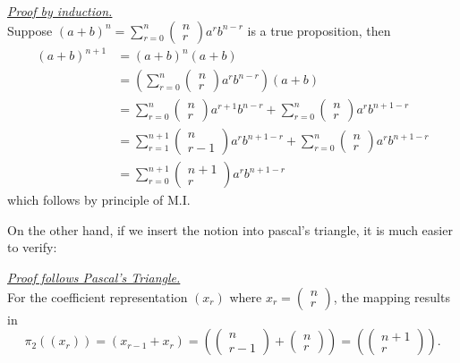 \documentclass[12pt]{article}
\renewenvironment{proof}[1][Proof]{\begin{snugshade*} \underline{\textit{{#1}.}}\\}{\hfill \qedsymbol \end{snugshade*}}
\begin{document}
    \begin{proof}[Proof by induction]
        Suppose $(a+b)^n=\sum_{r=0}^{n}\begin{pmatrix}
            n\\r
        \end{pmatrix}a^r b^{n-r}$ is a true proposition, then \begin{align*}
            (a+b)^{n+1}&=(a+b)^n(a+b)\\
            &=(\sum_{r=0}^{n}\begin{pmatrix}
                n\\r
            \end{pmatrix}a^r b^{n-r})(a+b)\\
            &=\sum_{r=0}^{n}\begin{pmatrix}
                n\\r
            \end{pmatrix}a^{r+1} b^{n-r} + \sum_{r=0}^{n}\begin{pmatrix}
                n\\r
            \end{pmatrix}a^r b^{n+1-r}\\
            &=\sum_{r=1}^{n+1}\begin{pmatrix}
                n\\r-1
            \end{pmatrix}a^{r} b^{n+1-r} + \sum_{r=0}^{n}\begin{pmatrix}
                n\\r
            \end{pmatrix}a^r b^{n+1-r}\\
            &=\sum_{r=0}^{n+1}\begin{pmatrix}
                n+1\\r
            \end{pmatrix}a^{r} b^{n+1-r}
        \end{align*}
        which follows by principle of M.I.
    \end{proof}

    On the other hand, if we insert the notion into pascal's triangle, it is much easier to verify:

    \begin{proof}[Proof follows Pascal's Triangle]
        For the coefficient representation $(x_r)$ where $x_r=\begin{pmatrix}
            n\\r
        \end{pmatrix}$, the mapping results in \[\pi_2((x_r))=(x_{r-1}+x_{r})=(\begin{pmatrix}
            n\\r-1
        \end{pmatrix}+\begin{pmatrix}
            n\\r
        \end{pmatrix})=(\begin{pmatrix}
            n+1\\r
        \end{pmatrix}).\]
    \end{proof}
\end{document}
